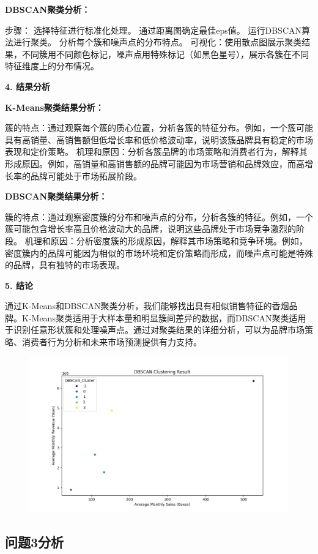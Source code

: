 \documentclass[a4paper]{article}
\begin{document}
\textbf{DBSCAN聚类分析：}

步骤：
选择特征进行标准化处理。
通过距离图确定最佳eps值。
运行DBSCAN算法进行聚类。
分析每个簇和噪声点的分布特点。
可视化：使用散点图展示聚类结果，不同簇用不同颜色标记，噪声点用特殊标记（如黑色星号），展示各簇在不同特征维度上的分布情况。

\textbf{4. 结果分析}

\textbf{K-Means聚类结果分析：}

簇的特点：通过观察每个簇的质心位置，分析各簇的特征分布。例如，一个簇可能具有高销量、高销售额但低增长率和低价格波动率，说明该簇品牌具有稳定的市场表现和定价策略。
机理和原因：分析各簇品牌的市场策略和消费者行为，解释其形成原因。例如，高销量和高销售额的品牌可能因为市场营销和品牌效应，而高增长率的品牌可能处于市场拓展阶段。

\textbf{DBSCAN聚类结果分析：}

簇的特点：通过观察密度簇的分布和噪声点的分布，分析各簇的特征。例如，一个簇可能包含增长率高且价格波动大的品牌，说明这些品牌处于市场竞争激烈的阶段。
机理和原因：分析密度簇的形成原因，解释其市场策略和竞争环境。例如，密度簇内的品牌可能因为相似的市场环境和定价策略而形成，而噪声点可能是特殊的品牌，具有独特的市场表现。

\textbf{5. 结论}

通过K-Means和DBSCAN聚类分析，我们能够找出具有相似销售特征的香烟品牌。K-Means聚类适用于大样本量和明显簇间差异的数据，而DBSCAN聚类适用于识别任意形状簇和处理噪声点。通过对聚类结果的详细分析，可以为品牌市场策略、消费者行为分析和未来市场预测提供有力支持。

\begin{figure}[H]
	\centering
	\includegraphics[width=1.0\textwidth]{img/Figure_2.png}
\end{figure}

\subsection{问题3分析}
\end{document}
